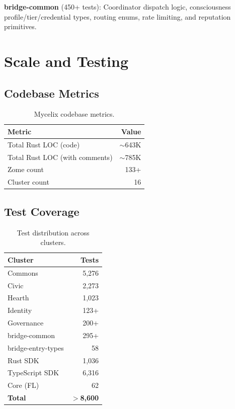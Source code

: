 \documentclass[11pt,twocolumn]{article}
\begin{document}
\textbf{bridge-common} (450+ tests): Coordinator dispatch logic, consciousness
profile/tier/credential types, routing enums, rate limiting, and reputation
primitives.

\section{Scale and Testing}

\subsection{Codebase Metrics}

\begin{table}[h]
\centering
\begin{tabular}{lr}
\toprule
\textbf{Metric} & \textbf{Value} \\
\midrule
Total Rust LOC (code) & $\sim$643K \\
Total Rust LOC (with comments) & $\sim$785K \\
Zome count & 133+ \\
Cluster count & 16 \\
\bottomrule
\end{tabular}
\caption{Mycelix codebase metrics.}
\end{table}

\subsection{Test Coverage}

\begin{table}[h]
\centering
\begin{tabular}{lr}
\toprule
\textbf{Cluster} & \textbf{Tests} \\
\midrule
Commons & 5,276 \\
Civic & 2,273 \\
Hearth & 1,023 \\
Identity & 123+ \\
Governance & 200+ \\
bridge-common & 295+ \\
bridge-entry-types & 58 \\
Rust SDK & 1,036 \\
TypeScript SDK & 6,316 \\
Core (FL) & 62 \\
\midrule
\textbf{Total} & \textbf{$>$8,600} \\
\bottomrule
\end{tabular}
\caption{Test distribution across clusters.}
\end{table}
\end{document}
